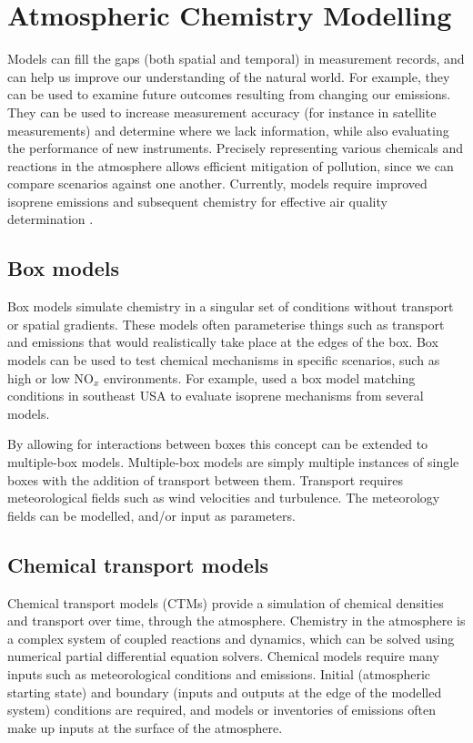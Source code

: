   
\section{Atmospheric Chemistry Modelling}
\label{LR:Models}
  
  Models can fill the gaps (both spatial and temporal) in measurement records, and can help us improve our understanding of the natural world.
  For example, they can be used to examine future outcomes resulting from changing our emissions.
  They can be used to increase measurement accuracy (for instance in satellite measurements) and determine where we lack information, while also evaluating the performance of new instruments.
  Precisely representing various chemicals and reactions in the atmosphere allows efficient mitigation of pollution, since we can compare scenarios against one another.
  Currently, models require improved isoprene emissions and subsequent chemistry for effective air quality determination \parencite{Marvin2017}.
  
  
  \subsection{Box models}
    
    Box models simulate chemistry in a singular set of conditions without transport or spatial gradients.
    These models often parameterise things such as transport and emissions that would realistically take place at the edges of the box.
    Box models can be used to test chemical mechanisms in specific scenarios, such as high or low NO$_x$ environments.
    For example, \textcite{Marvin2017} used a box model matching conditions in southeast USA to evaluate isoprene mechanisms from several models.  
    
    By allowing for interactions between boxes this concept can be extended to multiple-box models.
    Multiple-box models are simply multiple instances of single boxes with the addition of transport between them.
    Transport requires meteorological fields such as wind velocities and turbulence.
    The meteorology fields can be modelled, and/or input as parameters.
  
  
  \subsection{Chemical transport models}
    \label{LR:Models:ctm}
    Chemical transport models (CTMs) provide a simulation of chemical densities and transport over time, through the atmosphere.
    Chemistry in the atmosphere is a complex system of coupled reactions and dynamics, which can be solved using numerical partial differential equation solvers.
    Chemical models require many inputs such as meteorological conditions and emissions.
    Initial (atmospheric starting state) and boundary (inputs and outputs at the edge of the modelled system) conditions are required, and models or inventories of emissions often make up inputs at the surface of the atmosphere.
    

